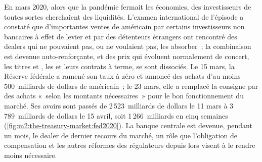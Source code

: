 En mars 2020, alors que la pandémie fermait les économies, des investisseurs de toutes sortes
cherchaient des liquidités. L'examen international de l'épisode a constaté que d'importantes
ventes de  américain par certains investisseurs non bancaires à effet de levier et par des détenteurs étrangers
ont rencontré des dealers qui ne pouvaient pas, ou ne voulaient pas, les absorber~; la combinaison
est devenue auto-renforçante, et des prix qui évoluent normalement de concert, les titres 
et , les  et leurs contrats à terme, se sont dissociés. Le 15 mars, la Réserve fédérale a ramené son taux à zéro
et annoncé des achats d'au moins 500~milliards de dollars de  américain~; le 23 mars,
elle a remplacé la consigne par des achats «~selon les montants nécessaires~» pour le
bon fonctionnement du marché. Ses avoirs sont passés de 2\,523~milliards de dollars le 11 mars à
3\,789~milliards de dollars le 15 avril, soit 1\,266~milliards en cinq semaines
(\cref{fig:m2:the-treasury-market:fed2020}). La banque centrale est devenue, pendant un
mois, le dealer de dernier recours du marché, un rôle que l'obligation de compensation et
les autres réformes des régulateurs depuis lors visent à le rendre moins nécessaire.

\begin{omfigure}

\label{fig:m2:the-treasury-market:fed2020}
\end{omfigure}

